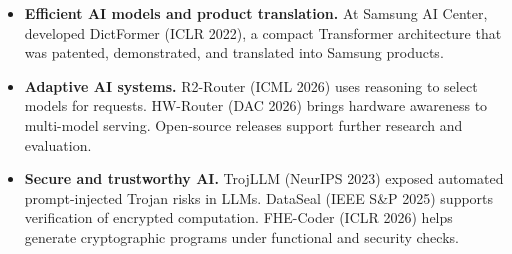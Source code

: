 \begin{itemize}
\item \textbf{Efficient AI models and product translation.} At Samsung AI Center, developed DictFormer (ICLR 2022), a compact Transformer architecture that was patented, demonstrated, and translated into Samsung products.
\item \textbf{Adaptive AI systems.} R2-Router (ICML 2026) uses reasoning to select models for requests. HW-Router (DAC 2026) brings hardware awareness to multi-model serving. Open-source releases support further research and evaluation.
\item \textbf{Secure and trustworthy AI.} TrojLLM (NeurIPS 2023) exposed automated prompt-injected Trojan risks in LLMs. DataSeal (IEEE S\&P 2025) supports verification of encrypted computation. FHE-Coder (ICLR 2026) helps generate cryptographic programs under functional and security checks.
\end{itemize}
